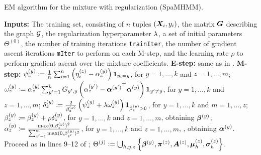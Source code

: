 \begin{algorithm}
	\caption{EM algorithm for the mixture with regularization (SpaMHMM).}
	\label{alg:spamhmm}
	\begin{algorithmic}[1]
		\State \textbf{Inputs:} The training set, consisting of $n$ tuples $({\bm{X}}_i,y_i)$, the matrix ${\bm{G}}$ describing the graph ${\mathcal{G}}$, the regularization hyperparameter $\lambda$, a set of initial parameters $\Theta^{(0)}$, the number of training iterations \texttt{trainIter}, the number of gradient ascent iterations \texttt{mIter} to perform on each M-step, and the learning rate $\rho$ to perform gradient ascent over the mixture coefficients.
		\vspace{0.3cm}
		\vspace{0.3cm}
		\State \textbf{E-step:} same as in .
		\vspace{0.3cm}
		\State \textbf{M-step:}
		\vspace{0.3cm}
		\Indent
		\vspace{0.3cm}
			\State $\psi^{(y)}_{z} \coloneqq \frac{1}{n}\sum_{i=1}^n \left(\eta^{(z)}_i - {\alpha}^{(y)}_{z}\right) \bm{1}_{y_i=y}$, for $y=1,\dots,k$ and $z=1,\dots,m$;
			\vspace{0.3cm}
			\State $\omega^{(y)}_{z} \coloneqq {\alpha}^{(y)}_{z} \sum_{y'=1}^k {G}_{y',y}\left({\alpha}^{(y')}_{z} - {{\bm{\alpha}}^{(y')}} ^\top {\bm{\alpha}}^{(y)} \right) \bm{1}_{y' \neq y}$, for $y=1,\dots,k$ and $z=1,\dots,m$;
			\vspace{0.3cm}
			\State $\delta^{(y)}_z \coloneqq \frac{2}{{\beta}^{(y)}_{z}}\left(\psi^{(y)}_{z} + \lambda \omega^{(y)}_{z}\right) \bm{1}_{{\beta}^{(y)}_{z} > 0}$, for $y=1,\dots,k$ and $m=1,\dots,z$;
			\vspace{0.3cm}
			\State ${\beta}^{(y)}_{z} \coloneqq {\beta}^{(y)}_{z} + \rho \delta^{(y)}_z$, for $y=1,\dots,k$ and $z=1,\dots,m$, obtaining ${\bm{\beta}}^{(y)}$;
			\vspace{0.3cm}
			\State ${\alpha}^{(y)}_{z} \coloneqq \frac{\max(0, {\beta^{(y)}_z})^2}{\sum_{z'=1}^m \max(0, {\beta^{(y)}_{z'}})^2}$, for $y=1,\dots,k$ and $z=1,\dots,m$, , obtaining ${\bm{\alpha}}^{(y)}$.
			\vspace{0.3cm}
		\EndFor
		\vspace{0.3cm}
		\State Proceed as in lines 9--12 of ;
		\vspace{0.3cm}
		\State $\Theta^{(j)} := \bigcup_{h,y,z} \left\lbrace {\bm{\beta}}^{(y)}, {\bm{\pi}}^{(z)}, {\bm{A}}^{(z)}, {\bm{\mu}}^{(z)}_h, {\bm{\sigma}}^{(z)}_h \right\rbrace$.
		\vspace{0.3cm}
		\EndIndent
		\EndFor
	\end{algorithmic}
\end{algorithm}

